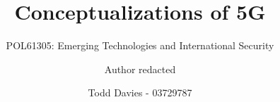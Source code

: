 \usepackage{microtype}
\usepackage{hyperref}

\usepackage{csquotes}

\usepackage{float}

\usepackage{setspace}

\usepackage{pgfplots}
\pgfplotsset{compat=newest}

\usepackage[square]{natbib}
\usepackage{url}
\DeclareRobustCommand{\firstsecond}[2]{#1}
\usepackage{caption}

\ifdefined\isanonymous
  \author{Author redacted}
\else
  \author{Todd Davies - 03729787}
\fi

\newcommand{\Title}{Conceptualizations of 5G}

\title{\Title}
\subtitle{POL61305: Emerging Technologies and International Security}
